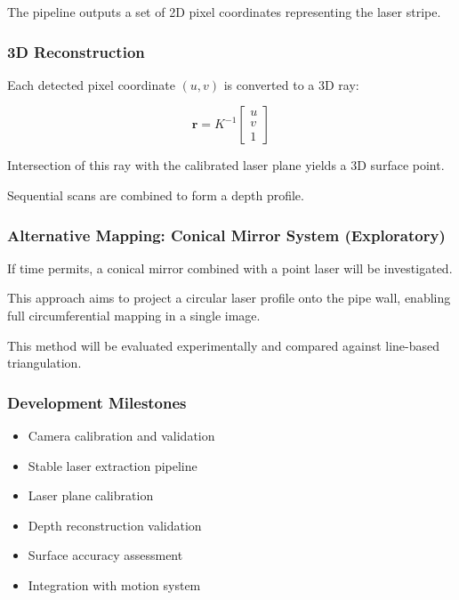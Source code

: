 \documentclass[11pt,a4paper]{article}
\begin{document}
The pipeline outputs a set of 2D pixel coordinates representing the laser stripe.

\subsubsection{3D Reconstruction}

Each detected pixel coordinate $(u,v)$ is converted to a 3D ray:

\begin{equation}
\mathbf{r} = K^{-1}
\begin{bmatrix}
u \\ v \\ 1
\end{bmatrix}
\end{equation}

Intersection of this ray with the calibrated laser plane yields a 3D surface point.

Sequential scans are combined to form a depth profile.

\subsubsection{Alternative Mapping: Conical Mirror System (Exploratory)}

If time permits, a conical mirror combined with a point laser will be investigated.

This approach aims to project a circular laser profile onto the pipe wall, enabling full circumferential mapping in a single image.

This method will be evaluated experimentally and compared against line-based triangulation.

\subsubsection{Development Milestones}

\begin{itemize}
  \item Camera calibration and validation
  \item Stable laser extraction pipeline
  \item Laser plane calibration
  \item Depth reconstruction validation
  \item Surface accuracy assessment
  \item Integration with motion system
\end{itemize}
\end{document}
